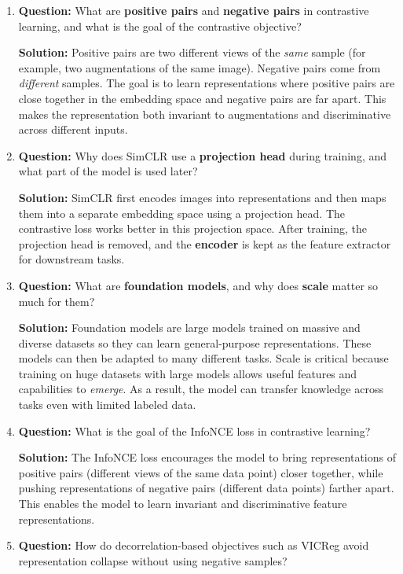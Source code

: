\documentclass{article}
\begin{document}
\begin{enumerate}
\item \textbf{Question:} 
What are \textbf{positive pairs} and \textbf{negative pairs} in contrastive learning, and what is the goal of the contrastive objective?

\textbf{Solution:}  
Positive pairs are two different views of the \emph{same} sample (for example, two augmentations of the same image). Negative pairs come from \emph{different} samples.  
The goal is to learn representations where positive pairs are close together in the embedding space and negative pairs are far apart. This makes the representation both invariant to augmentations and discriminative across different inputs.

\item \textbf{Question:} 
Why does SimCLR use a \textbf{projection head} during training, and what part of the model is used later?

\textbf{Solution:}  
SimCLR first encodes images into representations and then maps them into a separate embedding space using a projection head. The contrastive loss works better in this projection space.  
After training, the projection head is removed, and the \textbf{encoder} is kept as the feature extractor for downstream tasks.

\item \textbf{Question:} 
What are \textbf{foundation models}, and why does \textbf{scale} matter so much for them?

\textbf{Solution:}  
Foundation models are large models trained on massive and diverse datasets so they can learn general-purpose representations. These models can then be adapted to many different tasks.  
Scale is critical because training on huge datasets with large models allows useful features and capabilities to \emph{emerge}. As a result, the model can transfer knowledge across tasks even with limited labeled data.

\item \textbf{Question:}
What is the goal of the InfoNCE loss in contrastive learning?

\textbf{Solution:}
The InfoNCE loss encourages the model to bring representations of positive pairs (different views of the same data point) closer together, while pushing representations of negative pairs (different data points) farther apart. This enables the model to learn invariant and discriminative feature representations.

\item \textbf{Question:}
How do decorrelation-based objectives such as VICReg avoid representation collapse without using negative samples?


\end{enumerate}
\end{document}
